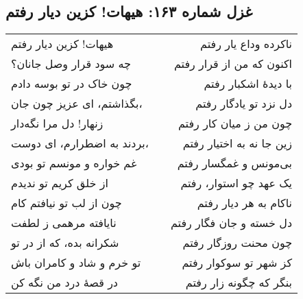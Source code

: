 \begin{center}
\section*{غزل شماره ۱۶۳: هیهات! کزین دیار رفتم}
\label{sec:163}
\begin{longtable}{l p{0.5cm} r}
هیهات! کزین دیار رفتم
&&
ناکرده وداع یار رفتم
\\
چه سود قرار وصل جانان؟
&&
اکنون که من از قرار رفتم
\\
چون خاک در تو بوسه دادم
&&
با دیدهٔ اشکبار رفتم
\\
بگذاشتم، ای عزیز چون جان،
&&
دل نزد تو یادگار رفتم
\\
زنهار! دل مرا نگه‌دار
&&
چون من ز میان کار رفتم
\\
بردند به اضطرارم، ای دوست،
&&
زین جا نه به اختیار رفتم
\\
غم خواره و مونسم تو بودی
&&
بی‌مونس و غمگسار رفتم
\\
از خلق کریم تو ندیدم
&&
یک عهد چو استوار، رفتم
\\
چون از لب تو نیافتم کام
&&
ناکام به هر دیار رفتم
\\
نایافته مرهمی ز لطفت
&&
دل خسته و جان فگار رفتم
\\
شکرانه بده، که از در تو
&&
چون محنت روزگار رفتم
\\
تو خرم و شاد و کامران باش
&&
کز شهر تو سوکوار رفتم
\\
در قصهٔ درد من نگه کن
&&
بنگر که چگونه زار رفتم
\\
\end{longtable}
\end{center}
